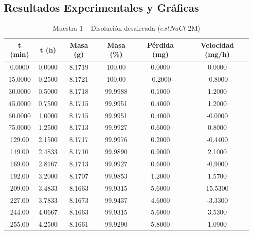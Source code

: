 \documentclass[11pt,a4paper]{article}
\begin{document}
\subsection{Resultados Experimentales y Gráficas}
\begin{table}[H]
\centering
\caption{Muestra 1 -- Disolución desaireada ($	ext{NaCl}$ 2M)}
\label{tab:3_3_des1}
\begin{tabular}{cccccc}
\toprule
t (min) & t (h) & Masa (g) & Masa (\%) & Pérdida (mg) & Velocidad (mg/h) \\
\midrule
0.0000 & 0.0000 & 8.1719 & 100.00 & 0.0000 & 0.0000 \\
15.0000 & 0.2500 & 8.1721 & 100.00 & -0.2000 & -0.8000 \\
30.0000 & 0.5000 & 8.1718 & 99.9988 & 0.1000 & 1.2000 \\
45.0000 & 0.7500 & 8.1715 & 99.9951 & 0.4000 & 1.2000 \\
60.0000 & 1.0000 & 8.1715 & 99.9951 & 0.4000 & -0.0000 \\
75.0000 & 1.2500 & 8.1713 & 99.9927 & 0.6000 & 0.8000 \\
129.00 & 2.1500 & 8.1717 & 99.9976 & 0.2000 & -0.4400 \\
149.00 & 2.4833 & 8.1710 & 99.9890 & 0.9000 & 2.1000 \\
169.00 & 2.8167 & 8.1713 & 99.9927 & 0.6000 & -0.9000 \\
192.00 & 3.2000 & 8.1707 & 99.9853 & 1.2000 & 1.5700 \\
209.00 & 3.4833 & 8.1663 & 99.9315 & 5.6000 & 15.5300 \\
227.00 & 3.7833 & 8.1673 & 99.9437 & 4.6000 & -3.3300 \\
244.00 & 4.0667 & 8.1663 & 99.9315 & 5.6000 & 3.5300 \\
255.00 & 4.2500 & 8.1661 & 99.9290 & 5.8000 & 1.0900 \\
\bottomrule
\end{tabular}
\end{table}
\end{document}
